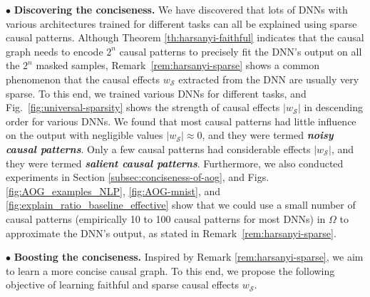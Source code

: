 \documentclass[10pt,twocolumn,letterpaper]{article}
\begin{document}
$\bullet$ \textbf{Discovering the conciseness.}
We have discovered that lots of DNNs with various architectures trained for different tasks can all be explained using sparse causal patterns.
Although Theorem \ref{th:harsanyi-faithful} indicates that the causal graph needs to encode {\small$2^n$} causal patterns to precisely fit the DNN's output on all the {\small$2^n$} masked samples, Remark~\ref{rem:harsanyi-sparse} shows a common phenomenon that the causal effects {\small$w_{\mathcal{S}}$} extracted from the DNN are usually very sparse.
To this end, we trained various DNNs for different tasks, and Fig.~\ref{fig:universal-sparsity} shows the strength of causal effects {\small$|w_{\mathcal{S}}|$} in descending order for various DNNs.
We found that most causal patterns had little influence on the output with negligible values {\small $|w_{\mathcal{S}}|\approx 0$}, and they were termed \textbf{\textit{noisy causal patterns}}.
Only a few causal patterns had considerable effects {\small $|w_{\mathcal{S}}|$}, and they were termed \textbf{\textit{salient causal patterns}}.
Furthermore, we also conducted experiments in Section \ref{subsec:conciseness-of-aog}, and Figs. \ref{fig:AOG_examples_NLP}, \ref{fig:AOG-mnist}, and \ref{fig:explain_ratio_baseline_effective} show that we could use a small number of causal patterns (empirically 10 to 100 causal patterns for most DNNs) in {\small$\Omega$} to approximate the DNN's output, as stated in Remark~\ref{rem:harsanyi-sparse}.


$\bullet$ \textbf{Boosting the conciseness.}
Inspired by Remark \ref{rem:harsanyi-sparse}, we aim to learn a more concise causal graph.
To this end, we propose the following objective of learning faithful and sparse causal effects {\small$w_{\mathcal{S}}$}.
\end{document}
